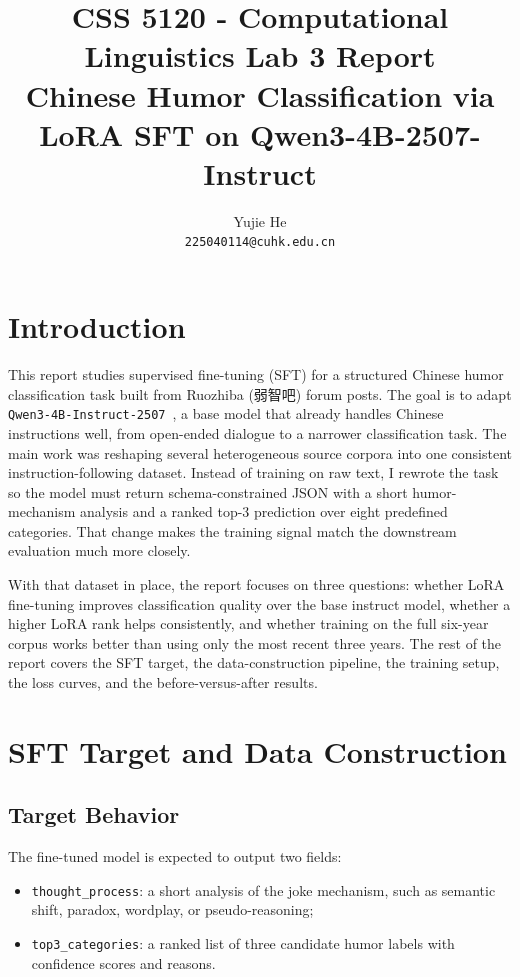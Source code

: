 \documentclass{article}
\title{CSS 5120 - Computational Linguistics Lab 3 Report\\
Chinese Humor Classification via LoRA SFT on Qwen3-4B-2507-Instruct}
\author{
Yujie He \\
\texttt{225040114@cuhk.edu.cn}
}
\begin{document}
\maketitle

\vspace{-2.5em}

\section{Introduction}

This report studies supervised fine-tuning (SFT) for a structured Chinese humor classification task built from Ruozhiba (弱智吧) forum posts. The goal is to adapt \texttt{Qwen3-4B-Instruct-2507}~\cite{Yang2025Qwen3}, a base model that already handles Chinese instructions well, from open-ended dialogue to a narrower classification task. The main work was reshaping several heterogeneous source corpora into one consistent instruction-following dataset. Instead of training on raw text, I rewrote the task so the model must return schema-constrained JSON with a short humor-mechanism analysis and a ranked top-3 prediction over eight predefined categories. That change makes the training signal match the downstream evaluation much more closely.

With that dataset in place, the report focuses on three questions: whether LoRA fine-tuning improves classification quality over the base instruct model, whether a higher LoRA rank helps consistently, and whether training on the full six-year corpus works better than using only the most recent three years. The rest of the report covers the SFT target, the data-construction pipeline, the training setup, the loss curves, and the before-versus-after results.

\section{SFT Target and Data Construction}

\subsection{Target Behavior}
The fine-tuned model is expected to output two fields:
\begin{itemize}[leftmargin=1.5em]
    \item \texttt{thought\_process}: a short analysis of the joke mechanism, such as semantic shift, paradox, wordplay, or pseudo-reasoning;
    \item \texttt{top3\_categories}: a ranked list of three candidate humor labels with confidence scores and reasons.
\end{itemize}
\end{document}
